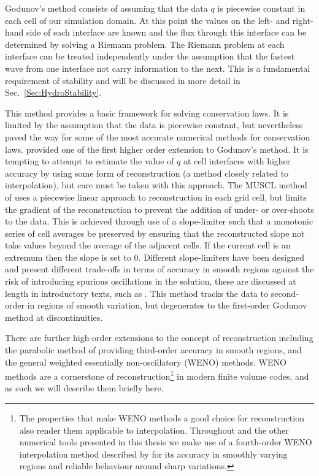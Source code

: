 Godunov's method \citep{Godunov1959} consists of assuming that the data $q$ is piecewise constant in each cell of our simulation domain.
At this point the values on the left- and right-hand side of each interface are known and the flux through this interface can be determined by solving a Riemann problem.
The Riemann problem at each interface can be treated independently under the assumption that the fastest wave from one interface not carry information to the next.
This is a fundamental requirement of stability and will be discussed in more detail in Sec.~\ref{Sec:HydroStability}.

This method provides a basic framework for solving conservation laws.
It is limited by the assumption that the data is piecewise constant, but nevertheless paved the way for some of the most accurate numerical methods for conservation laws.
\citet{VanLeer1979} provided one of the first higher order extension to Godunov's method.
It is tempting to attempt to estimate the value of $q$ at cell interfaces with higher accuracy by using some form of reconstruction (a method closely related to interpolation), but care must be taken with this approach.
The MUSCL method of \citet{VanLeer1979} uses a piecewise linear approach to reconstruction in each grid cell, but limits the gradient of the reconstruction to prevent the addition of under- or over-shoots to the data.
This is achieved through use of a slope-limiter such that a monotonic series of cell averages be preserved by ensuring that the reconstructed slope not take values beyond the average of the adjacent cells.
If the current cell is an extremum then the slope is set to 0.
Different slope-limiters have been designed and present different trade-offs in terms of accuracy in smooth regions against the risk of introducing spurious oscillations in the solution, these are discussed at length in introductory texts, such as \citet{LeVeque1997}.
This method tracks the data to second-order in regions of smooth variation, but degenerates to the first-order Godunov method at discontinuities.

There are further high-order extensions to the concept of reconstruction including the parabolic method of \citet{Colella1984} providing third-order accuracy in smooth regions, and the general weighted essentially non-oscillatory (WENO) methods.
WENO methods are a cornerstone of reconstruction\footnote{The properties that make WENO methods a good choice for reconstruction also render them applicable to interpolation. Throughout \Lw{} and the other numerical tools presented in this thesis we make use of a fourth-order WENO interpolation method described by \citet{Janett2019} for its accuracy in smoothly varying regions and reliable behaviour around sharp variations.} in modern finite volume codes, and as such we will describe them briefly here.

